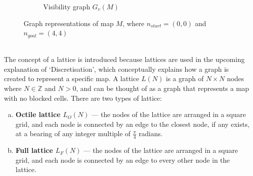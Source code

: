 \documentclass[12pt,notitlepage]{report}
\begin{document}
\begin{figure}
\begin{subfigure}{.5\textwidth}
    \caption{Visibility graph $G_{v}(M)$}
  \end{subfigure}
  \caption[Graph representations of map $M$]{Graph representations of map $M$, where $n_{start} = (0,0)$ and $n_{goal} = (4,4)$}
\end{figure}

\\
\noindent
The concept of a lattice is introduced because lattices are used in the upcoming explanation of `Discretisation', which conceptually explains how a graph is created to represent a specific map. A lattice $L(N)$ is a graph of $N \times N$ nodes where $N \in\mathbb{Z}$ and $N > 0$, and can be thought of as a graph that represents a map with no blocked cells. There are two types of lattice:\\

\begin{enumerate}[(a)]
\item{\bfseries Octile lattice $L_{O}(N)$} --- the nodes of the lattice are arranged in a square grid, and each node is connected by an edge to the closest node, if any exists, at a bearing of any integer multiple of $\frac{\pi}{4}$ radians.

\item{\bfseries Full lattice $L_{F}(N)$} --- the nodes of the lattice are arranged in a square grid, and each node is connected by an edge to every other node in the lattice.
\end{enumerate}
\end{document}
